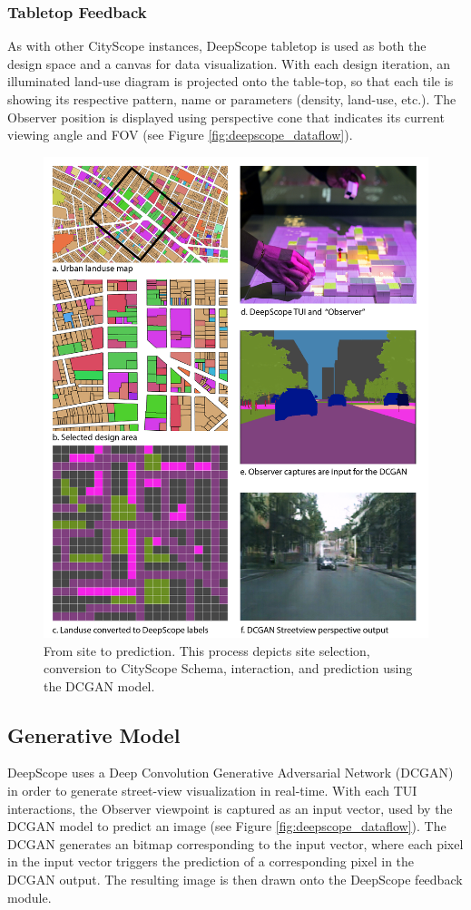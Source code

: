 {{        \subsubsection{Tabletop Feedback}\label{deepscope-table-top}
        {
            As with other CityScope instances, DeepScope tabletop is used as both the design space and a canvas for data visualization. With each design iteration, an illuminated land-use diagram is projected onto the table-top, so that each tile is showing its respective pattern, name or parameters (density, land-use, etc.). The Observer position is displayed using perspective cone that indicates its current viewing angle and FOV (see Figure \eqref{fig:deepscope_dataflow}).
        }
    }



    \begin{figure}[!htb]
        \centering
        \includegraphics[width=0.5\columnwidth]{chapters/prediction/deepscope/figures/deepscope6.jpg}
        \caption{From site to prediction. This process depicts site selection, conversion to CityScope Schema, interaction, and prediction using the DCGAN model.}
        \label{fig:deepscope_pixelation}
    \end{figure}

    \subsection{Generative Model}\label{DeepScope-Generative-Model}

    {
        DeepScope uses a Deep Convolution Generative Adversarial Network (DCGAN) in order to generate street-view visualization in real-time. With each TUI interactions, the Observer viewpoint is captured as an input vector, used by the DCGAN model to predict an image (see Figure \eqref{fig:deepscope_dataflow}). The DCGAN generates an bitmap corresponding to the input vector, where each pixel in the input vector triggers the prediction of a corresponding pixel in the DCGAN output. The resulting image is then drawn onto the DeepScope feedback module.
    }

}
